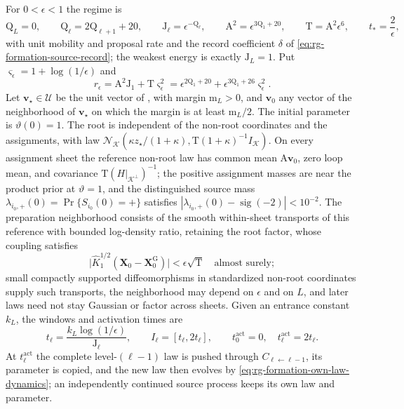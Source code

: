 For \(0<\epsilon<1\) the regime is
\begin{equation}
\mathrm Q_L=0,\qquad \mathrm Q_\ell=2\mathrm Q_{\ell+1}+20,\qquad
\mathrm J_\ell=\epsilon^{-\mathrm Q_\ell},\qquad
\mathrm A^2=\epsilon^{3\mathrm Q_1+20},\qquad
\mathrm T=\mathrm A^2\epsilon^6,\qquad t_*=\frac2\epsilon,
\label{eq:rg-formation-weakest-one-regime}
\end{equation}
with unit mobility and proposal rate and the record coefficient \(\delta\) of
\cref{eq:rg-formation-source-record}; the weakest energy is exactly
\(\mathrm J_L=1\). Put \(\varsigma_\epsilon=1+\log(1/\epsilon)\) and
\begin{equation}
r_\epsilon=\mathrm A^2\mathrm J_1+\mathrm T\varsigma_\epsilon^2
=\epsilon^{2\mathrm Q_1+20}+\epsilon^{3\mathrm Q_1+26}\varsigma_\epsilon^2.
\label{eq:rg-formation-parameter-remainder}
\end{equation}
Let \(\mathbf v_\star\in\mathcal U\) be the unit vector of
, with margin \(\mathrm m_L>0\), and
\(\mathbf v_0\) any vector of the neighborhood of \(\mathbf v_\star\) on which
the margin is at least \(\mathrm m_L/2\). The initial parameter is
\(\vartheta(0)=1\). The root is independent of the non-root coordinates and
the assignments, with law \(\mathcal N_{\mathcal K}(\kappa z_\star/(1+\kappa),
\mathrm T(1+\kappa)^{-1}I_{\mathcal K})\). On every assignment sheet the
reference non-root law has common mean \(\mathrm A\mathbf v_0\), zero loop
mean, and covariance \(\mathrm T(H|_{\mathcal K^\perp})^{-1}\); the positive
assignment masses are near the product prior at \(\vartheta=1\), and the
distinguished source mass \(\lambda_{i_0,+}(0)=\Pr\{S_{i_0}(0)=+\}\) satisfies
\(|\lambda_{i_0,+}(0)-\operatorname{sig}(-2)|<10^{-2}\). The preparation
neighborhood consists of the smooth within-sheet transports of this reference
with bounded log-density ratio, retaining the root factor, whose coupling
satisfies
\begin{equation}
\bigl|\widehat K_1^{1/2}(\mathbf X_0-\mathbf X_0^{\mathrm G})\bigr|
 <\epsilon\sqrt{\mathrm T}
\quad\text{almost surely};
\label{eq:rg-formation-preparation-transport}
\end{equation}
small compactly supported diffeomorphisms in standardized non-root coordinates
supply such transports, the neighborhood may depend on \(\epsilon\) and on
\(L\), and later laws need not stay Gaussian or factor across sheets. Given an
entrance constant \(k_L\), the windows and activation times are
\begin{equation}
t_\ell=\frac{k_L\log(1/\epsilon)}{\mathrm J_\ell},
\qquad I_\ell=[t_\ell,2t_\ell],\qquad
t^{\mathrm{act}}_0=0,\quad t^{\mathrm{act}}_\ell=2t_\ell.
\label{eq:rg-formation-activation-times}
\end{equation}
At \(t^{\mathrm{act}}_\ell\) the complete level-\((\ell-1)\) law is pushed
through \(C_{\ell\leftarrow\ell-1}\), its parameter is copied, and the new law
then evolves by \cref{eq:rg-formation-own-law-dynamics}; an independently
continued source process keeps its own law and parameter.

